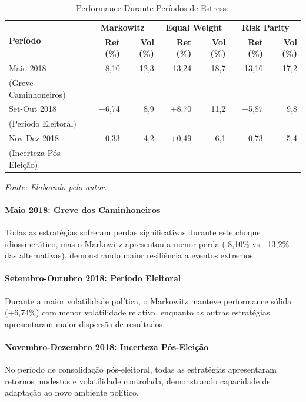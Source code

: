 \begin{table}[H]
\centering
\caption{Performance Durante Períodos de Estresse}
\scriptsize
\begin{tabular}{|l|r|r|r|r|r|r|}
\hline
\multirow{2}{*}{\textbf{Período}} & \multicolumn{2}{c|}{\textbf{Markowitz}} & \multicolumn{2}{c|}{\textbf{Equal Weight}} & \multicolumn{2}{c|}{\textbf{Risk Parity}} \\
\cline{2-7}
& \textbf{Ret (\%)} & \textbf{Vol (\%)} & \textbf{Ret (\%)} & \textbf{Vol (\%)} & \textbf{Ret (\%)} & \textbf{Vol (\%)} \\
\hline
Maio 2018 & -8,10 & 12,3 & -13,24 & 18,7 & -13,16 & 17,2 \\
(Greve Caminhoneiros) & & & & & & \\
\hline
Set-Out 2018 & +6,74 & 8,9 & +8,70 & 11,2 & +5,87 & 9,8 \\
(Período Eleitoral) & & & & & & \\
\hline
Nov-Dez 2018 & +0,33 & 4,2 & +0,49 & 6,1 & +0,73 & 5,4 \\
(Incerteza Pós-Eleição) & & & & & & \\
\hline
\end{tabular}
\normalsize

\textit{Fonte: Elaborado pelo autor.}
\label{tab:stress_periods}
\end{table}

\paragraph{Maio 2018: Greve dos Caminhoneiros}
Todas as estratégias sofreram perdas significativas durante este choque idiossincrático, mas o Markowitz apresentou a menor perda (-8,10\% vs. -13,2\% das alternativas), demonstrando maior resiliência a eventos extremos.

\paragraph{Setembro-Outubro 2018: Período Eleitoral}
Durante a maior volatilidade política, o Markowitz manteve performance sólida (+6,74\%) com menor volatilidade relativa, enquanto as outras estratégias apresentaram maior dispersão de resultados.

\paragraph{Novembro-Dezembro 2018: Incerteza Pós-Eleição}
No período de consolidação pós-eleitoral, todas as estratégias apresentaram retornos modestos e volatilidade controlada, demonstrando capacidade de adaptação ao novo ambiente político.

